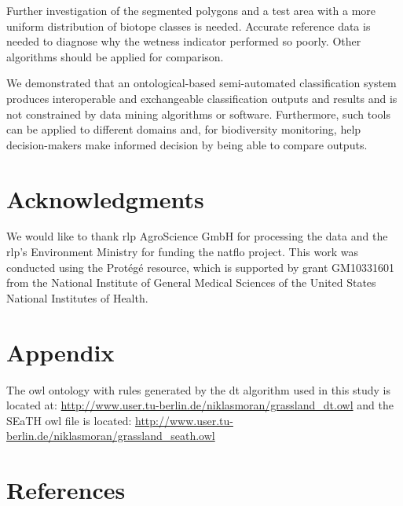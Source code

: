 \documentclass[authoryear,review,12pt,number]{elsarticle}
\begin{document}
Further investigation of the segmented polygons and a test area with a more
uniform distribution of biotope classes is needed. Accurate reference data is
needed to diagnose why the wetness indicator performed so poorly. Other 
algorithms should be applied for comparison.

We demonstrated that an ontological-based semi-automated classification system
produces interoperable and exchangeable classification outputs
and results and is not constrained by data mining
algorithms or software. Furthermore, such tools can be applied to different 
domains and, for biodiversity monitoring, help decision-makers make informed 
decision by being able to compare outputs.
\section{Acknowledgments}
We would like to thank \gls{rlp} AgroScience GmbH for processing the data and 
the \gls{rlp}'s Environment Ministry for funding the \gls{natflo} project. This 
work was conducted using the Prot\'eg\'e resource, which is supported by grant 
GM10331601 from the National Institute of General Medical Sciences of the 
United States National Institutes of Health.
\section{Appendix}
The \gls{owl} ontology with rules generated by the \gls{dt} algorithm used in 
this study is located at: 
\url{http://www.user.tu-berlin.de/niklasmoran/grassland_dt.owl} and the SEaTH 
\gls{owl} file is located: 
\url{http://www.user.tu-berlin.de/niklasmoran/grassland_seath.owl}

\section{References}

\end{document}
